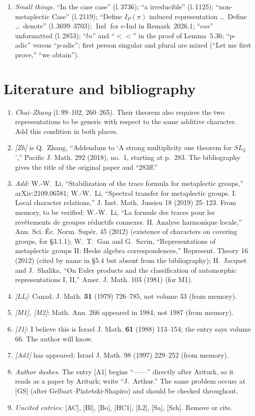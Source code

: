 \documentclass[12pt,letterpaper]{article}
\newcommand{\lref}[1]{\textup{(l.\,#1)}}
\theoremstyle{plain}
\begin{document}
\begin{enumerate}
\item \emph{Small things.} ``In the case case'' \lref{3736}; ``a
irreducible'' \lref{1125}; ``non-metaplectic Case'' \lref{2119}; ``Define
$I_P(\pi)$ induced representation \dots\ Define \dots\ denote''
\lref{3699--3703}; $\operatorname{Ind}$ for c-Ind in Remark~2026.1;
``$cos$'' unformatted \lref{2853}; ``$ln$'' and ``$<<$'' in the proof of
Lemma~5.36; ``p-adic'' versus ``$p$-adic''; first person singular and
plural are mixed (``Let me first prove,'' ``we obtain'').
\end{enumerate}

\section{Literature and bibliography}\label{sec:bib}

\begin{enumerate}
\item \emph{Chai--Zhang} \lref{99--102, 260--265}. Their theorem also
requires the two representations to be generic with respect to the same
additive character. Add this condition in both places.
\item \emph{[Zh]} is Q.~Zhang, ``Addendum to `A strong multiplicity one
theorem for $SL_2$','' Pacific J. Math. 292 (2018), no.~1, starting at
p.~283. The bibliography gives the title of the original paper and
``283ff.''
\item \emph{Add:} W.-W.~Li, ``Stabilization of the trace formula for
metaplectic groups,'' arXiv:2109.06581; W.-W.~Li, ``Spectral transfer for
metaplectic groups. I. Local character relations,'' J. Inst. Math. Jussieu
18 (2019) 25--123. From memory, to be verified: W.-W.~Li, ``La formule des
traces pour les rev\^etements de groupes r\'eductifs connexes. II. Analyse
harmonique locale,'' Ann. Sci. \'Ec. Norm. Sup\'er. 45 (2012) (existence of
characters on covering groups, for \S3.1.1); W.~T.~Gan and G.~Savin,
``Representations of metaplectic groups II: Hecke algebra
correspondences,'' Represent. Theory 16 (2012) (cited by name in \S5.4 but
absent from the bibliography); H.~Jacquet and J.~Shalika, ``On Euler
products and the classification of automorphic representations I, II,''
Amer. J. Math. 103 (1981) (for M1).
\item \emph{[LL]}: Canad. J. Math. \textbf{31} (1979) 726--785, not volume
33 (from memory).
\item \emph{[M1], [M2]}: Math. Ann. 266 appeared in 1984, not 1987 (from
memory).
\item \emph{[J1]}: I believe this is Israel J. Math. \textbf{61} (1988)
113--154; the entry says volume 66. The author will know.
\item \emph{[Ad1]} has appeared: Israel J. Math. 98 (1997) 229--252 (from
memory).
\item \emph{Author dashes.} The entry [A1] begins ``------'' directly
after Ariturk, so it reads as a paper by Ariturk; write ``J.~Arthur.'' The
same problem occurs at [GS] (after Gelbart--Piatetski-Shapiro) and should
be checked throughout.
\item \emph{Uncited entries:} [AC], [Bl], [Bo], [HC1], [L2], [Sa], [Sch].
Remove or cite.
\end{enumerate}
\end{document}
